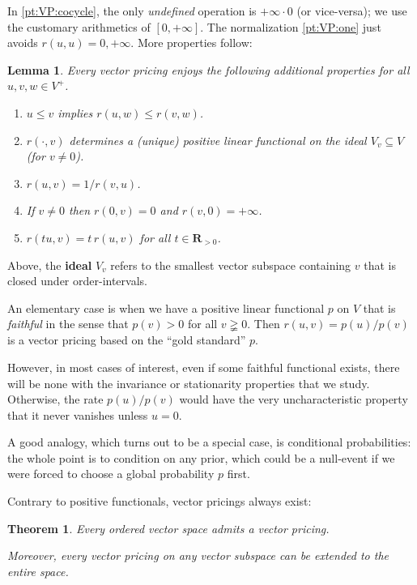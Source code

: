 \documentclass[11pt]{amsart}
\numberwithin{equation}{section}
\newtheorem{ithm}{Theorem}
\newtheorem*{ilem*}{Lemma}
\theoremstyle{definition}
\theoremstyle{definition}
\newcommand*{\RR}{\mathbf{R}}
\newcommand*{\se}{\subseteq}
\begin{document}
\noindent
In \ref{pt:VP:cocycle}, the only \emph{undefined} operation is $+\infty\cdot 0$ (or vice-versa); we use the customary arithmetics of $[0, +\infty]$. The normalization \ref{pt:VP:one} just avoids $r(u,u)=0, +\infty$.  More properties follow:

\begin{ilem*}
Every vector pricing enjoys the following additional properties for all $u,v,w\in V^+$.
\begin{enumerate}[resume*]
\item $u\leq v$ implies $r(u, w) \leq r(v, w)$. \label{pt:VP:monotone}
\item  $r(\cdot, v)$ determines a (unique) positive linear functional on the ideal $V_v \se V$ (for $v\neq 0$). \label{pt:VP:extends}
\item $r(u, v) = 1/ r(v, u)$. \label{pt:VP:inv}
\item If $v\neq 0$ then $r(0, v) = 0$ and $r(v, 0) = +\infty$. \label{pt:VP:0}
\item $r(t u,v) = t\, r(u,v)$ for all $t\in \RR_{>0}$. \label{pt:VP:hom}
\end{enumerate}
\end{ilem*}

Above, the \textbf{ideal} $V_v$ refers to the smallest vector subspace containing $v$ that is closed under order-intervals.


\medskip
An elementary case is when we have a positive linear functional $p$ on $V$ that is \emph{faithful} in the sense that $p(v)>0$ for all $v\gneqq 0$. Then $r(u,v)=p(u)/p(v)$ is a vector pricing based on the ``gold standard'' $p$. 

However, in most cases of interest, even if some faithful functional exists, there will be none with the invariance or stationarity properties that we study. Otherwise, the rate $p(u)/p(v)$ would have the very uncharacteristic property that it never vanishes unless $u=0$.

A good analogy, which turns out to be a special case, is conditional probabilities: the whole point is to condition on any prior, which could be a null-event if we were forced to choose a global probability $p$ first.


\medskip
Contrary to positive functionals, vector pricings always exist:

\begin{ithm}\label{ithm:VP:exists-and-extends}
Every ordered vector space admits a vector pricing.

Moreover, every vector pricing on any vector subspace can be extended to the entire space.
\end{ithm}
\end{document}

